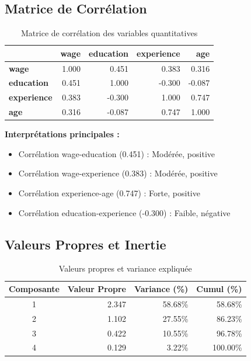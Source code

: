 \documentclass[12pt,a4paper]{report}
\begin{document}
\subsection{Matrice de Corrélation}

\begin{table}[H]
\centering
\caption{Matrice de corrélation des variables quantitatives}
\begin{tabular}{|l|r|r|r|r|}
\hline
 & \textbf{wage} & \textbf{education} & \textbf{experience} & \textbf{age} \\
\hline
\textbf{wage} & 1.000 & 0.451 & 0.383 & 0.316 \\
\hline
\textbf{education} & 0.451 & 1.000 & -0.300 & -0.087 \\
\hline
\textbf{experience} & 0.383 & -0.300 & 1.000 & 0.747 \\
\hline
\textbf{age} & 0.316 & -0.087 & 0.747 & 1.000 \\
\hline
\end{tabular}
\end{table}

\textbf{Interprétations principales :}
\begin{itemize}
    \item Corrélation wage-education (0.451) : Modérée, positive
    \item Corrélation wage-experience (0.383) : Modérée, positive
    \item Corrélation experience-age (0.747) : Forte, positive
    \item Corrélation education-experience (-0.300) : Faible, négative
\end{itemize}

\subsection{Valeurs Propres et Inertie}

\begin{table}[H]
\centering
\caption{Valeurs propres et variance expliquée}
\begin{tabular}{|c|r|r|r|}
\hline
\textbf{Composante} & \textbf{Valeur Propre} & \textbf{Variance (\%)} & \textbf{Cumul (\%)} \\
\hline
1 & 2.347 & 58.68\% & 58.68\% \\
\hline
2 & 1.102 & 27.55\% & 86.23\% \\
\hline
3 & 0.422 & 10.55\% & 96.78\% \\
\hline
4 & 0.129 & 3.22\% & 100.00\% \\
\hline
\end{tabular}
\end{table}
\end{document}
